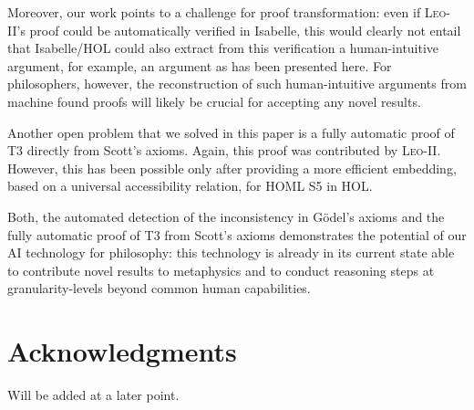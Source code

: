\documentclass{article}
\begin{document}
Moreover, our work points to a challenge for proof transformation:
even if \textsc{Leo-II}'s proof could be automatically verified
in Isabelle, this would clearly not entail that Isabelle/HOL could
also extract from this verification a human-intuitive argument, for
example, an argument as has been presented here. For philosophers,
however, the reconstruction of such human-intuitive arguments from
machine found proofs will likely be crucial for accepting any novel results.

Another open problem that we solved in this paper is a fully automatic
proof of T3 directly from Scott's axioms. Again, this proof was
contributed by \textsc{Leo-II}. However, this has been possible only
after providing a more efficient embedding, based on a universal
accessibility relation, for HOML S5 in HOL. 

Both, the automated detection of the inconsistency in G\"odel's axioms
and the fully automatic proof of T3 from Scott's axioms demonstrates
the potential of our AI technology for philosophy: this technology is
already in its current state able to contribute novel results to
metaphysics and to conduct reasoning steps at granularity-levels
beyond common human capabilities.









\section*{Acknowledgments}

Will be added at a later point.





\newpage






\end{document}
